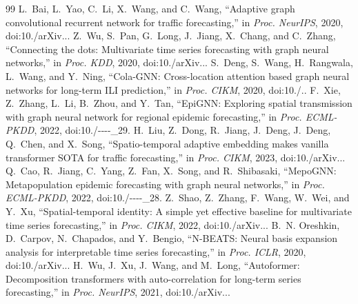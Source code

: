 \begin{thebibliography}{99}\footnotesize\sloppy
{} L.~Bai, L.~Yao, C.~Li, X.~Wang, and C.~Wang, ``Adaptive graph convolutional recurrent network for traffic forecasting,'' in \emph{Proc. NeurIPS}, 2020, doi:10./\allowbreak arXiv...\allowbreak 
{} Z.~Wu, S.~Pan, G.~Long, J.~Jiang, X.~Chang, and C.~Zhang, ``Connecting the dots: Multivariate time series forecasting with graph neural networks,'' in \emph{Proc. KDD}, 2020, doi:10./\allowbreak arXiv...\allowbreak 
{} S.~Deng, S.~Wang, H.~Rangwala, L.~Wang, and Y.~Ning, ``Cola-GNN: Cross-location attention based graph neural networks for long-term ILI prediction,'' in \emph{Proc. CIKM}, 2020, doi:10./..\allowbreak 
{} F.~Xie, Z.~Zhang, L.~Li, B.~Zhou, and Y.~Tan, ``EpiGNN: Exploring spatial transmission with graph neural network for regional epidemic forecasting,'' in \emph{Proc. ECML-PKDD}, 2022, doi:10./----\_29.\allowbreak 
{} H.~Liu, Z.~Dong, R.~Jiang, J.~Deng, J.~Deng, Q.~Chen, and X.~Song, ``Spatio-temporal adaptive embedding makes vanilla transformer SOTA for traffic forecasting,'' in \emph{Proc. CIKM}, 2023, doi:10./\allowbreak arXiv...\allowbreak 
{} Q.~Cao, R.~Jiang, C.~Yang, Z.~Fan, X.~Song, and R.~Shibasaki, ``MepoGNN: Metapopulation epidemic forecasting with graph neural networks,'' in \emph{Proc. ECML-PKDD}, 2022, doi:10./----\_28.\allowbreak 
{} Z.~Shao, Z.~Zhang, F.~Wang, W.~Wei, and Y.~Xu, ``Spatial-temporal identity: A simple yet effective baseline for multivariate time series forecasting,'' in \emph{Proc. CIKM}, 2022, doi:10./\allowbreak arXiv...\allowbreak 
{} B.~N. Oreshkin, D.~Carpov, N.~Chapados, and Y.~Bengio, ``N-BEATS: Neural basis expansion analysis for interpretable time series forecasting,'' in \emph{Proc. ICLR}, 2020, doi:10./\allowbreak arXiv...\allowbreak 
{} H.~Wu, J.~Xu, J.~Wang, and M.~Long, ``Autoformer: Decomposition transformers with auto-correlation for long-term series forecasting,'' in \emph{Proc. NeurIPS}, 2021, doi:10./\allowbreak arXiv...\allowbreak 

\end{thebibliography}
